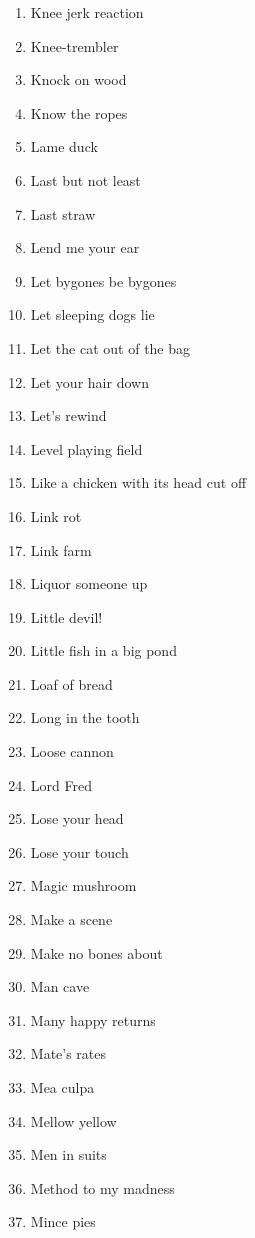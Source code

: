 \begin{enumerate}
        \item  Knee jerk reaction
        \item  Knee-trembler
        \item  Knock on wood
        \item  Know the ropes
        \item  Lame duck
        \item  Last but not least
        \item  Last straw
        \item  Lend me your ear
        \item  Let bygones be bygones
        \item  Let sleeping dogs lie
        \item  Let the cat out of the bag
        \item  Let your hair down
        \item  Let's rewind
        \item  Level playing field
        \item  Like a chicken with its head cut off
        \item  Link rot
        \item  Link farm
        \item  Liquor someone up
        \item  Little devil!
        \item  Little fish in a big pond
        \item  Loaf of bread
        \item  Long in the tooth
        \item  Loose cannon
        \item  Lord Fred
        \item  Lose your head
        \item  Lose your touch
        \item  Magic mushroom
        \item  Make a scene
        \item  Make no bones about
        \item  Man cave
        \item  Many happy returns
        \item  Mate's rates
        \item  Mea culpa
        \item  Mellow yellow
        \item  Men in suits
        \item  Method to my madness
        \item  Mince pies

\end{enumerate}

